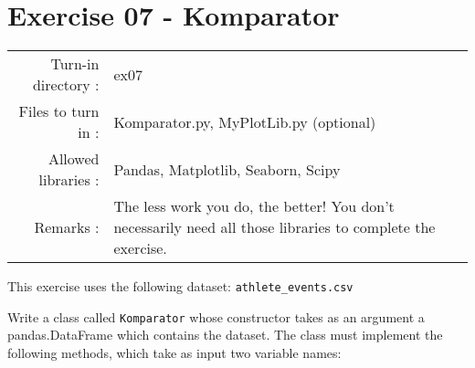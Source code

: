 \documentclass[]{article}
\begin{document}
\clearpage

\hypertarget{exercise-07---komparator-1}{%
\section{Exercise 07 - Komparator}\label{exercise-07---komparator-1}}

\begin{longtable}[]{@{}rl@{}}
\toprule
\endhead
\begin{minipage}[t]{0.54\columnwidth}\raggedleft
Turn-in directory :\strut
\end{minipage} & \begin{minipage}[t]{0.40\columnwidth}\raggedright
ex07\strut
\end{minipage}\tabularnewline
\begin{minipage}[t]{0.54\columnwidth}\raggedleft
Files to turn in :\strut
\end{minipage} & \begin{minipage}[t]{0.40\columnwidth}\raggedright
Komparator.py, MyPlotLib.py (optional)\strut
\end{minipage}\tabularnewline
\begin{minipage}[t]{0.54\columnwidth}\raggedleft
Allowed libraries :\strut
\end{minipage} & \begin{minipage}[t]{0.40\columnwidth}\raggedright
Pandas, Matplotlib, Seaborn, Scipy\strut
\end{minipage}\tabularnewline
\begin{minipage}[t]{0.54\columnwidth}\raggedleft
Remarks :\strut
\end{minipage} & \begin{minipage}[t]{0.40\columnwidth}\raggedright
The less work you do, the better! You don't necessarily need all those
libraries to complete the exercise.\strut
\end{minipage}\tabularnewline
\bottomrule
\end{longtable}

This exercise uses the following dataset: \texttt{athlete\_events.csv}

Write a class called \texttt{Komparator} whose constructor takes as an
argument a pandas.DataFrame which contains the dataset. The class must
implement the following methods, which take as input two variable names:
\end{document}
